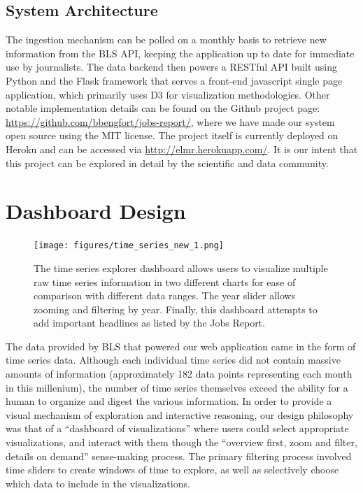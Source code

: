 \documentclass{sigchi}
\begin{document}
\subsection{System Architecture}

The ingestion mechanism can be polled on a monthly basis to retrieve new information from the BLS API, keeping the application up to date for immediate use by journalists. The data backend then powers a RESTful API built using Python and the Flask framework that serves a front-end javascript single page application, which primarily uses D3 for visualization methodologies. Other notable implementation details can be found on the Github project page: \url{https://github.com/bbengfort/jobs-report/}, where we have made our system open source using the MIT license. The project itself is currently deployed on Heroku and can be accessed via \url{http://elmr.herokuapp.com/}. It is our intent that this project can be explored in detail by the scientific and data community.

\section{Dashboard Design}

\begin{figure}[!ht]
    \centering
    \texttt{[image: figures/time\_series\_new\_1.png]}
    \caption{The time series explorer dashboard allows users to visualize multiple raw time series information in two different charts for ease of comparison with different data ranges. The year slider allows zooming and filtering by year. Finally, this dashboard attempts to add important headlines as listed by the Jobs Report.}
    \label{fig:time_series}
\end{figure}

The data provided by BLS that powered our web application came in the form of time series data. Although each individual time series did not contain massive amounts of information (approximately 182 data points representing each month in this millenium), the number of time series themselves exceed the ability for a human to organize and digest the various information. In order to provide a visual mechanism of exploration and interactive reasoning, our design philosophy was that of a ``dashboard of visualizations'' where users could select appropriate visualizations, and interact with them though the ``overview first, zoom and filter, details on demand'' sense-making process. The primary filtering process involved time sliders to create windows of time to explore, as well as selectively choose which data to include in the visualizations.
\end{document}
